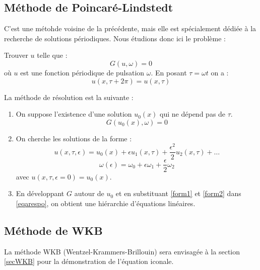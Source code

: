 \documentclass[12pt]{book}
\begin{document}
\subsection{M\'ethode de Poincar\'e-Lindstedt}
C'est une m\'etohde voisine de la pr\'ec\'edente, mais elle est
sp\'ecialement d\'edi\'ee \`a la recherche de solutions p\'eriodiques.
Nous \'etudions donc ici le probl\`eme :
\begin{prob}
Trouver $u$ telle que :
\begin{equation}\label{eqarespo}
G(u,\omega)=0
\end{equation}
o\`u $u$ est une fonction p\'eriodique de pulsation $\omega$. En
posant $\tau=\omega t$ on a :
\begin{equation}
u(x,\tau +2\pi)=u(x,\tau)
\end{equation}
\end{prob}
La m\'ethode de r\'esolution est la suivante :
\begin{alg}
\begin{enumerate}
\item On suppose l'existence d'une solution $u_0(x)$ qui ne d\'epend
pas de $\tau$.
\begin{equation}
G(u_0(x),\omega)=0
\label{fix}
\end{equation}
\item 
On cherche les solutions de la forme :
\begin{equation}
u(x,\tau,\epsilon)=u_0(x)+\epsilon
u_1(x,\tau)+\frac{\epsilon^2}{2}u_2(x,\tau)+\dots
\label{form1}
\end{equation}
\begin{equation}
\omega(\epsilon)=\omega_0+\epsilon\omega_1+\frac{\epsilon}{2}\omega_2
\label{form2}
\end{equation}
avec  $u(x,\tau,\epsilon=0)=u_0(x)$.
\item En d\'eveloppant $G$ autour de $u_0$ et en substituant
\ref{form1} et \ref{form2} dans \ref{eqarespo}, on obtient une
hi\'erarchie d'\'equations lin\'eaires.
\end{enumerate}
\end{alg}


\subsection{M\'ethode de WKB}\label{mathsecWKB}
La m\'ethode WKB (Wentzel-Krammers-Brillouin) sera envisag\'ee \`a la section
\ref{secWKB} pour la d\'emonstration de l'\'equation iconale.
\end{document}

